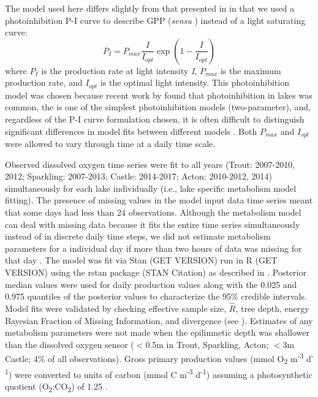 \documentclass[12pt, oneside]{article}
\begin{document}
The model used here differs slightly from that presented in \citealt{phillips_timevarying_2020} in that we used a photoinhibition P-I curve \citep{steele_environmental_1962} to describe GPP (\emph{sensu} \citealt{staehr_global_2016}) instead of a light saturating curve: 
\[
P_I = P_{max} \frac{I}{I_{opt}} \exp\left(1-\frac{I}{I_{opt}} \right)
\]
where \(P_I\) is the production rate at light intensity \emph{I}, \(P_{max}\) is the maximum production rate, and \(I_{opt}\) is the optimal light intensity. This photoinhibition model was chosen because recent work by \citet{staehr_global_2016} found that photoinhibition in lakes was common, the \citet{steele_environmental_1962} is one of the simplest photoinhibition models (two-parameter), and, regardless of the P-I curve formulation chosen, it is often difficult to distinguish significant differences in model fits between different models \citep{Aalderink_Jovin_1997}. Both \(P_{max}\) and \(I_{opt}\) were allowed to vary through time at a daily time scale.

Observed dissolved oxygen time series were fit to all years (Trout: 2007-2010, 2012; Sparkling: 2007-2013; Castle: 2014-2017; Acton: 2010-2012, 2014) simultaneously for each lake individually (i.e., lake specific metabolism model fitting). The presence of missing values in the model input data time series meant that some days had less than 24 observations. Although the metabolism model can deal with missing data because it fits the entire time series simultaneously instead of in discrete daily time steps, we did not estimate metabolism parameters for a individual day if more than two hours of data was missing for that day \citep{phillips_timevarying_2020}. The model was fit via Stan (GET VERSION) run in R (GET VERSION) using the rstan package (STAN Citation) as described in \citep{phillips_timevarying_2020}. Posterior median values were used for daily production values along with the 0.025 and 0.975 quantiles of the posterior values to characterize the 95\% credible intervals. Model fits were validated by checking effective sample size, $\hat{R}$, tree depth, energy Bayesian Fraction of Missing Information, and divergence (see \citealt{betancourt_robust_2007}). Estimates of any metabolism parameters were not made when the epilimnetic depth was shallower than the dissolved oxygen sensor ($<$0.5m in Trout, Sparkling, Acton; $<$3m Castle; 4\% of all observations). Gross primary production values (mmol O\textsubscript{2} m\textsuperscript{-3} d\textsuperscript{-1}) were converted to units of carbon (mmol C m\textsuperscript{-3} d\textsuperscript{-1}) assuming a photosynthetic quotient (O\textsubscript{2}:CO\textsubscript{2}) of 1.25 \citep{bott_primary_1996,hanson_lake_2003,wielgat-rychert_calculation_2017}. 
\end{document}

